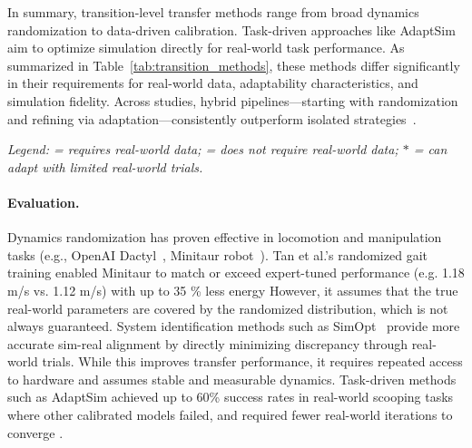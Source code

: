 In summary, transition-level transfer methods range from broad dynamics randomization to data-driven calibration. Task-driven approaches like AdaptSim aim to optimize simulation directly for real-world task performance. As summarized in Table~\ref{tab:transition_methods}, these methods differ significantly in their requirements for real-world data, adaptability characteristics, and simulation fidelity. Across studies, hybrid pipelines—starting with randomization and refining via adaptation—consistently outperform isolated strategies~\cite{Chebotar2019,Ren2023}.


\begin{table}[t]
\centering
\caption{Comparison of Transition-Level Transfer Methods}
\label{tab:transition_methods}
\vspace{0.2em}
\small\textit{
Legend:  = requires real-world data;  = does not require real-world data; $\ast$ = can adapt with limited real-world trials.}
\end{table}

\paragraph{Evaluation.} Dynamics randomization has proven effective in locomotion and manipulation tasks (e.g., OpenAI Dactyl~\cite{Akkaya2019}, Minitaur robot~\cite{Tan2018}). Tan et al.'s randomized gait training enabled Minitaur to match or exceed expert-tuned performance (e.g. 1.18 m/s vs. 1.12 m/s) with up to 35 \% less energy \cite{Tan2018} However, it assumes that the true real-world parameters are covered by the randomized distribution, which is not always guaranteed. System identification methods such as SimOpt~\cite{Chebotar2019} provide more accurate sim-real alignment by directly minimizing discrepancy through real-world trials. While this improves transfer performance, it requires repeated access to hardware and assumes stable and measurable dynamics. Task-driven methods such as AdaptSim achieved up to 60\% success rates in real-world scooping tasks where other calibrated models failed, and required fewer real-world iterations to converge \cite{Ren2023}.
